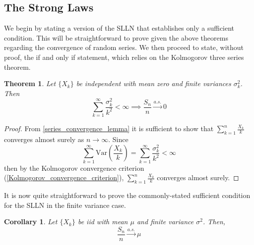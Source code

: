 \documentclass[12pt]{article}
\newcommand{\Var}{\mathrm{Var}}
\newtheorem{thm}{Theorem}
\newtheorem{corollary}{Corollary}
\begin{document}
\subsection{The Strong Laws}
We begin by stating a version of the SLLN that establishes only a sufficient condition. This will be straightforward to prove given the above theorems regarding the convergence of random 
series. We then proceed to state, without proof, the if and only if statement, which relies on the Kolmogorov three series theorem.

\begin{thm}
Let $\{X_k\}$ be independent with mean zero and finite variances $\sigma_k^2$. Then 
\[\sum_{k = 1}^{\infty} \frac{\sigma_k^2}{k^2} < \infty \implies \frac{S_n}{n} \overset{a.s.}{\to} 0\]
\end{thm}

\begin{proof}
From \ref{series_convergence_lemma} it is sufficient to show that $\sum_{k = 1}^{n} \frac{X_k}{k}$ converges almost surely as $n \to \infty$. Since 
\[\sum_{k = 1}^{\infty} \Var\left(\frac{X_k}{k}\right) = \sum_{k = 1}^{\infty} \frac{\sigma_k^2}{k^2} < \infty \]
then by the Kolmogorov convergence criterion (\ref{Kolmogorov_convergence_criterion}), $\sum_{k = 1}^{n} \frac{X_k}{k}$ converges almost surely. 
\end{proof}
It is now quite straightforward to prove the commonly-stated sufficient condition for the SLLN in the finite variance case. 
\begin{corollary} 
Let $\{X_k\}$ be iid with mean $\mu$ and finite variance $\sigma^2$. Then, 
\[\frac{S_n}{n} \overset{a.s.}{\to} \mu\]
\end{corollary}
\end{document}
